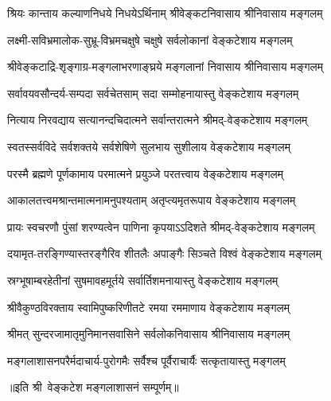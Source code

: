 
\twolineshloka
{श्रियः कान्ताय कल्याणनिधये निधयेऽर्थिनाम्}
{श्रीवेङ्कटनिवासाय श्रीनिवासाय मङ्गलम्}

\twolineshloka
{लक्ष्मी-सविभ्रमालोक-सुभ्रू-विभ्रमचक्षुषे}
{चक्षुषे सर्वलोकानां वेङ्कटेशाय मङ्गलम्}

\twolineshloka
{श्रीवेङ्कटाद्रि-शृङ्गाग्र-मङ्गलाभरणाङ्घ्रये}
{मङ्गलानां निवासाय श्रीनिवासाय मङ्गलम्}

\twolineshloka
{सर्वावयवसौन्दर्य-सम्पदा सर्वचेतसाम्}
{सदा सम्मोहनायास्तु वेङ्कटेशाय मङ्गलम्}

\twolineshloka
{नित्याय निरवद्याय सत्यानन्दचिदात्मने}
{सर्वान्तरात्मने श्रीमद्-वेङ्कटेशाय मङ्गलम्}

\twolineshloka
{स्वतस्सर्वविदे सर्वशक्तये सर्वशेषिणे}
{सुलभाय सुशीलाय वेङ्कटेशाय मङ्गलम्}

\twolineshloka
{परस्मै ब्रह्मणे पूर्णकामाय परमात्मने}
{प्रयुञ्जे परतत्त्वाय वेङ्कटेशाय मङ्गलम्}

\twolineshloka
{आकालतत्त्वमश्रान्तमात्मनामनुपश्यताम्}
{अतृप्त्यमृतरूपाय वेङ्कटेशाय मङ्गलम्}

\twolineshloka
{प्रायः स्वचरणौ पुंसां शरण्यत्वेन पाणिना}
{कृपयाऽऽदिशते श्रीमद्-वेङ्कटेशाय मङ्गलम्}

\twolineshloka
{दयामृत-तरङ्गिण्यास्तरङ्गैरिव शीतलैः}
{अपाङ्गैः सिञ्चते विश्वं वेङ्कटेशाय मङ्गलम्}

\twolineshloka
{स्रग्भूषाम्बरहेतीनां सुषमावहमूर्तये}
{सर्वार्तिशमनायास्तु वेङ्कटेशाय मङ्गलम्}

\twolineshloka
{श्रीवैकुण्ठविरक्ताय स्वामिपुष्करिणीतटे}
{रमया रममाणाय वेङ्कटेशाय मङ्गलम्}

\twolineshloka
{श्रीमत् सुन्दरजामातृमुनिमानसवासिने}
{सर्वलोकनिवासाय श्रीनिवासाय मङ्गलम्}

\twolineshloka
{मङ्गलाशासनपरैर्मदाचार्य-पुरोगमैः}
{सर्वैश्च पूर्वैराचार्यैः सत्कृतायास्तु मङ्गलम्}

॥इति श्री~वेङ्कटेश मङ्गलाशासनं सम्पूर्णम्॥